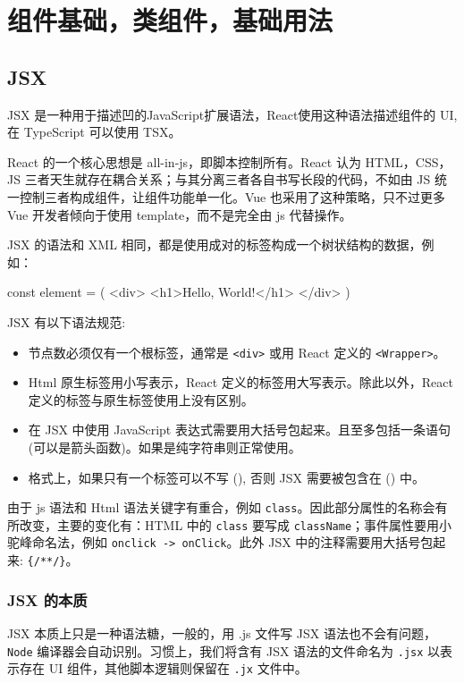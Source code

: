 \section{组件基础，类组件，基础用法}

\subsection{JSX}

JSX 是一种用于描述凹的JavaScript扩展语法，React使用这种语法描述组件的 UI, 在 TypeScript 可以使用 TSX。

React 的一个核心思想是 all-in-js，即脚本控制所有。React 认为 HTML，CSS，JS 三者天生就存在耦合关系；与其分离三者各自书写长段的代码，不如由 JS 统一控制三者构成组件，让组件功能单一化。Vue 也采用了这种策略，只不过更多 Vue 开发者倾向于使用 template，而不是完全由 js 代替操作。

JSX 的语法和 XML 相同，都是使用成对的标签构成一个树状结构的数据，例如：

\begin{JavaScript}
const element = (
    <div>
        <h1>Hello, World!</h1>
    </div>
)
\end{JavaScript}

JSX 有以下语法规范:
\begin{itemize}
    \item 节点数必须仅有一个根标签，通常是 \texttt{<div>} 或用 React 定义的 \texttt{<Wrapper>}。
    \item Html 原生标签用小写表示，React 定义的标签用大写表示。除此以外，React 定义的标签与原生标签使用上没有区别。
    \item 在 JSX 中使用 JavaScript 表达式需要用大括号包起来。且至多包括一条语句(可以是箭头函数)。如果是纯字符串则正常使用。
    \item 格式上，如果只有一个标签可以不写 (), 否则 JSX 需要被包含在 () 中。
\end{itemize}

由于 js 语法和 Html 语法关键字有重合，例如 \texttt{class}。因此部分属性的名称会有所改变，主要的变化有：HTML 中的 \texttt{class} 要写成 \texttt{className}；事件属性要用小驼峰命名法，例如 \texttt{onclick -> onClick}。此外 JSX 中的注释需要用大括号包起来: \texttt{\{/**/\}}。

\subsubsection*{JSX 的本质}

JSX 本质上只是一种语法糖，一般的，用 .js 文件写 JSX 语法也不会有问题，\texttt{Node} 编译器会自动识别。习惯上，我们将含有 JSX 语法的文件命名为 \texttt{.jsx} 以表示存在 UI 组件，其他脚本逻辑则保留在 \texttt{.jx} 文件中。

